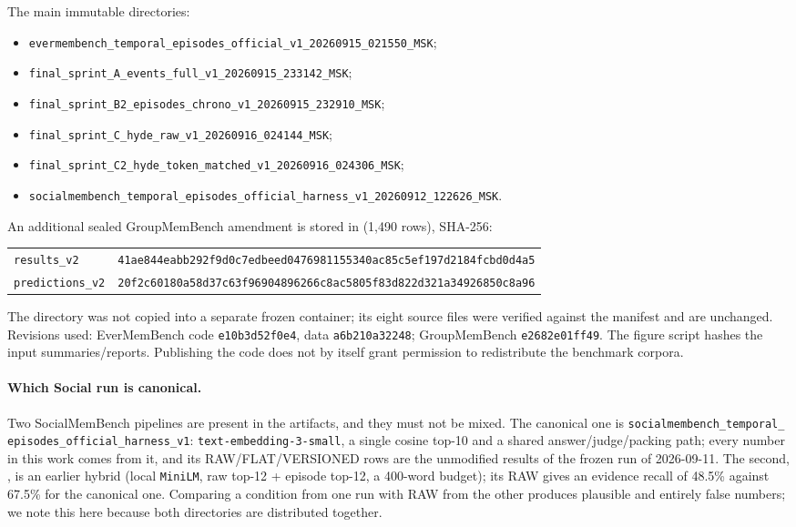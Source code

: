\documentclass[11pt,a4paper]{article}
\newcommand{\raw}{RAW}
\begin{document}
The main immutable directories:
\begin{itemize}
\item \texttt{evermembench\_temporal\_episodes\_official\_v1\_20260915\_021550\_MSK};
\item \texttt{final\_sprint\_A\_events\_full\_v1\_20260915\_233142\_MSK};
\item \texttt{final\_sprint\_B2\_episodes\_chrono\_v1\_20260915\_232910\_MSK};
\item \texttt{final\_sprint\_C\_hyde\_raw\_v1\_20260916\_024144\_MSK};
\item \texttt{final\_sprint\_C2\_hyde\_token\_matched\_v1\_20260916\_024306\_MSK};
\item \texttt{socialmembench\_temporal\_episodes\_official\_harness\_v1\_20260912\_122626\_MSK}.
\end{itemize}
An additional sealed GroupMemBench amendment is stored in
 (1,490 rows), SHA-256:
\begin{center}\small
\begin{tabular}{@{}ll@{}}
\texttt{results\_v2} & \texttt{41ae844eabb292f9d0c7edbeed0476981155340ac85c5ef197d2184fcbd0d4a5}\\
\texttt{predictions\_v2} & \texttt{20f2c60180a58d37c63f96904896266c8ac5805f83d822d321a34926850c8a96}
\end{tabular}
\end{center}
The directory was not copied into a separate frozen container; its eight source files
were verified against the manifest and are unchanged. Revisions used: EverMemBench code
\texttt{e10b3d52f0e4}, data \texttt{a6b210a32248}; GroupMemBench \texttt{e2682e01ff49}. The
figure script hashes the input summaries/reports. Publishing the code does not by itself
grant permission to redistribute the benchmark corpora.

\paragraph{Which Social run is canonical.}
Two SocialMemBench pipelines are present in the artifacts, and they must not be mixed.
The canonical one is \texttt{socialmembench\_temporal\_}\allowbreak
\texttt{episodes\_official\_harness\_v1}: \texttt{text-embedding-3-small}, a single cosine
top-10 and a shared answer/judge/packing path; every number in this work comes from it,
and its RAW/FLAT/VERSIONED rows are the unmodified results of the frozen run of
2026-09-11. The second, , is an earlier
hybrid (local \texttt{MiniLM}, raw top-12 + episode top-12, a 400-word budget); its \raw{}
gives an evidence recall of 48.5\% against 67.5\% for the canonical one. Comparing a
condition from one run with \raw{} from the other produces plausible and entirely false
numbers; we note this here because both directories are distributed together.
\end{document}
